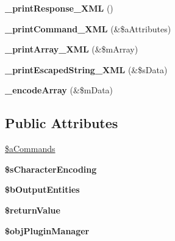 \begin{DoxyCompactItemize}
\item 
\hypertarget{classxajaxResponse_aaba317854c2c4c93b1d7e083c8d7b2e8}{
{\bfseries \_\-printResponse\_\-XML} ()}
\label{classxajaxResponse_aaba317854c2c4c93b1d7e083c8d7b2e8}

\item 
\hypertarget{classxajaxResponse_a73fa8a6d359b00f9fe0035daced6c7d3}{
{\bfseries \_\-printCommand\_\-XML} (\&\$aAttributes)}
\label{classxajaxResponse_a73fa8a6d359b00f9fe0035daced6c7d3}

\item 
\hypertarget{classxajaxResponse_aea776407a2b01b4bbbf0eec9da9b92c7}{
{\bfseries \_\-printArray\_\-XML} (\&\$mArray)}
\label{classxajaxResponse_aea776407a2b01b4bbbf0eec9da9b92c7}

\item 
\hypertarget{classxajaxResponse_a3c5397f898ec4a52cf00bc91a5f95907}{
{\bfseries \_\-printEscapedString\_\-XML} (\&\$sData)}
\label{classxajaxResponse_a3c5397f898ec4a52cf00bc91a5f95907}

\item 
\hypertarget{classxajaxResponse_a296e45d61af73701e0fe55d1a8a751fd}{
{\bfseries \_\-encodeArray} (\&\$mData)}
\label{classxajaxResponse_a296e45d61af73701e0fe55d1a8a751fd}

\end{DoxyCompactItemize}
\subsection*{Public Attributes}
\begin{DoxyCompactItemize}
\item 
\hyperlink{classxajaxResponse_a0ada3803cf2660ff9ffac0d578a4bf7c}{\$aCommands}
\item 
\hypertarget{classxajaxResponse_a804fc31411c65e57aa5bc766cc9f4392}{
{\bfseries \$sCharacterEncoding}}
\label{classxajaxResponse_a804fc31411c65e57aa5bc766cc9f4392}

\item 
\hypertarget{classxajaxResponse_ad5928b61f4e14d426bc8fed4761f6c69}{
{\bfseries \$bOutputEntities}}
\label{classxajaxResponse_ad5928b61f4e14d426bc8fed4761f6c69}

\item 
\hypertarget{classxajaxResponse_a107a0188f32c861dd84b36e5b2ad1738}{
{\bfseries \$returnValue}}
\label{classxajaxResponse_a107a0188f32c861dd84b36e5b2ad1738}

\item 
\hypertarget{classxajaxResponse_a440cf5bccf26d4606ac777b11ab773e1}{
{\bfseries \$objPluginManager}}
\label{classxajaxResponse_a440cf5bccf26d4606ac777b11ab773e1}

\end{DoxyCompactItemize}


